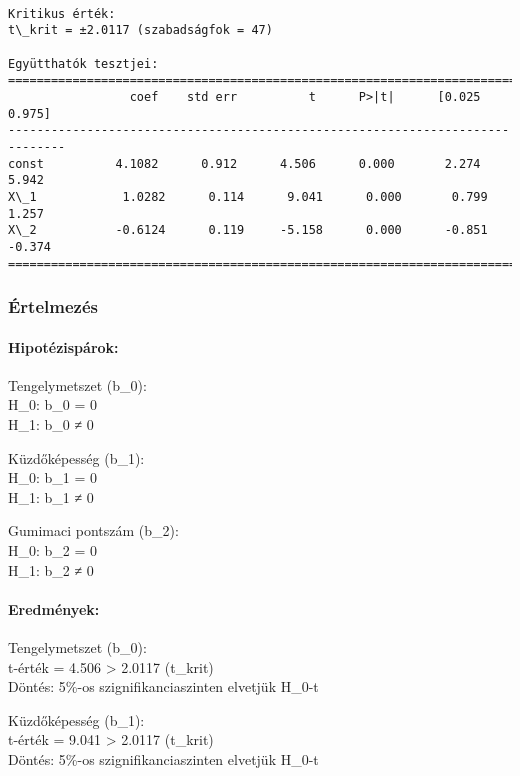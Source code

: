 \documentclass[11pt]{article}
\begin{document}
    \begin{Verbatim}[commandchars=\\\{\}]

Kritikus érték:
t\_krit = ±2.0117 (szabadságfok = 47)

Együtthatók tesztjei:
==============================================================================
                 coef    std err          t      P>|t|      [0.025      0.975]
------------------------------------------------------------------------------
const          4.1082      0.912      4.506      0.000       2.274       5.942
X\_1            1.0282      0.114      9.041      0.000       0.799       1.257
X\_2           -0.6124      0.119     -5.158      0.000      -0.851      -0.374
==============================================================================
    \end{Verbatim}

    \subsubsection{Értelmezés}\label{uxe9rtelmezuxe9s}

\paragraph{Hipotézispárok:}\label{hipotuxe9zispuxe1rok}

Tengelymetszet (b\_0):\\
H\_0: b\_0 = 0\\
H\_1: b\_0 ≠ 0

Küzdőképesség (b\_1):\\
H\_0: b\_1 = 0\\
H\_1: b\_1 ≠ 0

Gumimaci pontszám (b\_2):\\
H\_0: b\_2 = 0\\
H\_1: b\_2 ≠ 0

\paragraph{Eredmények:}\label{eredmuxe9nyek}

Tengelymetszet (b\_0):\\
\textbar t-érték\textbar{} = 4.506 \textgreater{} 2.0117 (t\_krit)\\
Döntés: 5\%-os szignifikanciaszinten elvetjük H\_0-t

Küzdőképesség (b\_1):\\
\textbar t-érték\textbar{} = 9.041 \textgreater{} 2.0117 (t\_krit)\\
Döntés: 5\%-os szignifikanciaszinten elvetjük H\_0-t
\end{document}
